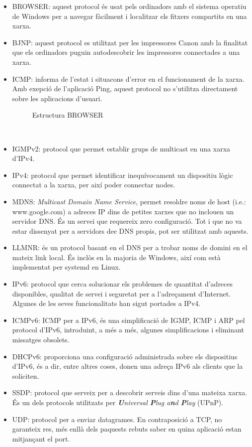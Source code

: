 \documentclass{article}
\begin{document}
\begin{itemize}
\item BROWSER: aquest protocol és usat pels ordinadors amb el sistema operatiu de 
Windows per a navegar fàcilment i localitzar els fitxers compartits en una xarxa.
\item BJNP: aquest protocol es utilitzat per les impressores Canon amb la finalitat
que els ordinadors puguin autodescobrir les impressores connectades a una xarxa.
\item ICMP: informa de l'estat i situacons d'error en el funcionament de la xarxa. Amb
exepció de l'aplicació Ping, aquest protocol no s'utilitza directament sobre les
aplicacions d'usuari.
\begin{figure}[!h]
\centering

\caption{Estructura BROWSER}
\label{frm:brw}
\end{figure}\\
\item IGMPv2: protocol que permet establir grups de multicast en una xarxa d'IPv4.
\item IPv4: protocol que permet identificar inequívocament un dispositiu lògic 
connectat a la xarxa, per així poder connectar nodes.
\item MDNS: \textit{Multicast Domain Name Service}, permet resoldre noms de host
(i.e.: www.google.com) a  adreces IP dins de petites xarxes que no inclouen 
un servidor DNS. És un servei que requereix zero configuració. Tot i que no va
estar dissenyat per a servidors dee DNS propis, pot ser utilitzat amb aquests.
\item LLMNR: és un protocol basant en el DNS per a trobar noms de domini en el mateix
link local. És inclòs en la majoria de Windows, així com està implementat per
systemd en Linux.
\item IPv6: protocol que cerca solucionar els problemes de quantitat d'adreces
disponibles, qualitat de servei i seguretat per a l'adreçament d'Internet. 
Algunes de les seves funcionalitats han sigut portades a IPv4.
\item ICMPv6: ICMP per a IPv6, és una simplificació de IGMP, ICMP i ARP pel protocol
d'IPv6, introduint, a més a més, algunes simplificacions i eliminant missatges obsolets.
\item DHCPv6: proporciona una configuració administrada sobre els dispositius d'IPv6,
és a dir, entre altres coses, donen una adreça IPv6 als clients que la soliciten.
\item SSDP: protocol que serveix per a descobrir serveis dins d'una mateixa xarxa.
És un dels protocols utilitzats per \textit{\textbf{U}niversal \textbf{P}lug 
a\textbf{n}d \textbf{P}lay} (UPnP).
\item UDP: protocol per a enviar datagrames. En contraposició a TCP, no garanteix res,
més enllà dels paquests rebuts saber en quina aplicació estan mitjançant el port.
\end{itemize}
\end{document}
